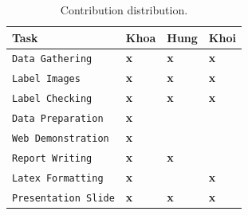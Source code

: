 \begin{table}[H]
\label{Table Contribution}
\caption{\label{Contribution}Contribution distribution.}
    \begin{center}
        \begin{tabular}{ | m{15em} | m{4em}| m{4em} | m{4em} | } 
            \hline
                \centering\textbf{Task} & 
                \centering\textbf{Khoa} & 
                \centering\textbf{Hung} & 
                \centering\textbf{Khoi} 
                \tabularnewline
            \hline
                \texttt{Data Gathering} &
                \centering\textbf{x} &
                \centering\textbf{x} &
                \centering\textbf{x}
                \tabularnewline
            \hline
                \texttt{Label Images} &
                \centering\textbf{x} &
                \centering\textbf{x} &
                \centering\textbf{x}
                \tabularnewline
            \hline
                \texttt{Label Checking} &
                \centering\textbf{x} &
                \centering\textbf{x} &
                \centering\textbf{x}
                \tabularnewline
            \hline
                \texttt{Data Preparation} &
                \centering\textbf{x} &
                \centering\textbf{} &
                \centering\textbf{}
                \tabularnewline
            \hline
                \texttt{Web Demonstration} &
                \centering\textbf{x} &
                \centering\textbf{} &
                \centering\textbf{}
                \tabularnewline
            \hline
                \texttt{Report Writing} &
                \centering\textbf{x} &
                \centering\textbf{x} &
                \centering\textbf{}
                \tabularnewline
            \hline
                \texttt{Latex Formatting} &
                \centering\textbf{x} &
                \centering\textbf{} &
                \centering\textbf{x}
                \tabularnewline
            \hline
                \texttt{Presentation Slide} &
                \centering\textbf{x} &
                \centering\textbf{x} &
                \centering\textbf{x}
                \tabularnewline
            \hline
        \end{tabular}
    \end{center}
\end{table}
